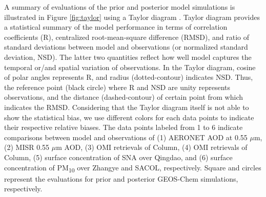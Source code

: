  A summary of evaluations of the prior and posterior model simulations
 is illustrated in Figure \ref{fig:taylor} using a Taylor diagram \citep{Taylor01}.
 Taylor diagram provides a statistical summary of the model performance
 in terms of correlation coefficients (R), centralized root-mean-square difference (RMSD),
 and ratio of standard deviations between model and observations (or normalized standard deviation, NSD).
 The latter two quantities reflect how well model captures
 the temporal or/and spatial variation of observations.
 In the Taylor diagram, cosine of polar angles represents R, and radius (dotted-contour) indicates NSD.
 Thus, the reference point (black circle) where R and NSD are unity represents observations,
 and the distance (dashed-contour) of certain point from which indicates the RMSD.
 Considering that the Taylor diagram itself is not able to show the statistical bias,
 we use different colors for each data points to indicate their respective relative biases.
 The data points labeled from 1 to 6 indicate comparisons between model and observations of
 (1) AERONET AOD at 0.55 $\mu$m,
 (2) MISR 0.55 $\mu$m AOD,
 (3) OMI retrievals of  Column,
 (4) OMI retrievals of  Column,
 (5) surface concentration of SNA over Qingdao, and
 (6) surface concentration of PM\textsubscript{10} over Zhangye and SACOL, respectively.
 Square and circles represent the evaluations for prior and posterior GEOS-Chem simulations, respectively.

